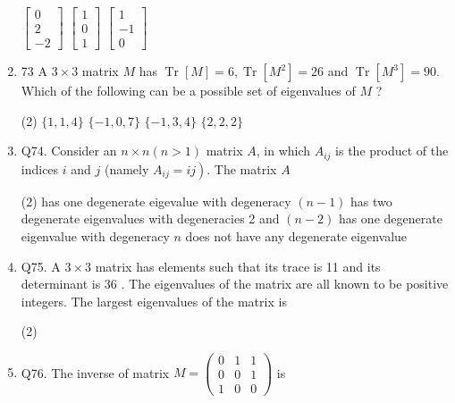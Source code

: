 \begin{enumerate}
\begin{tasks}
 	\task[\textbf{b.}]$\left[\begin{array}{c}0 \\ 2 \\ -2\end{array}\right]$
 	\task[\textbf{c.}]$\left[\begin{array}{l}1 \\ 0 \\ 1\end{array}\right]$
 	\task[\textbf{d.}] $\left[\begin{array}{c}1 \\ -1 \\ 0\end{array}\right]$
 \end{tasks}
 \item 73  A $3 \times 3$ matrix $M$ has $\operatorname{Tr}[M]=6, \operatorname{Tr}\left[M^{2}\right]=26$ and $\operatorname{Tr}\left[M^{3}\right]=90$. Which of the following can be a possible set of eigenvalues of $M$ ?
      \begin{tasks}(2)
     	\task[\textbf{a.}]$\{1,1,4\}$
     	\task[\textbf{b.}]$\{-1,0,7\}$
     	\task[\textbf{c.}]$\{-1,3,4\}$
     	\task[\textbf{d.}] $\{2,2,2\}$
     \end{tasks}
\item     Q74. Consider an $n \times n(n>1)$ matrix $A$, in which $A_{i j}$ is the product of the indices $i$ and $j$ (namely $\left.A_{i j}=i j\right)$. The matrix $A$
      \begin{tasks}(2)
     	\task[\textbf{a.}]has one degenerate eigevalue with degeneracy $(n-1)$
     	\task[\textbf{b.}]has two degenerate eigenvalues with degeneracies 2 and $(n-2)$
     	\task[\textbf{c.}]has one degenerate eigenvalue with degeneracy $n$
     	\task[\textbf{d.}] does not have any degenerate eigenvalue
     \end{tasks}
 \item     Q75. A $3 \times 3$ matrix has elements such that its trace is 11 and its determinant is 36 . The eigenvalues of the matrix are all known to be positive integers. The largest eigenvalues of the matrix is
     \begin{tasks}(2)
    \end{tasks} 
\item Q76. The inverse of matrix $M=\left(\begin{array}{lll}0 & 1 & 1 \\ 0 & 0 & 1 \\ 1 & 0 & 0\end{array}\right)$ is

\end{enumerate}
